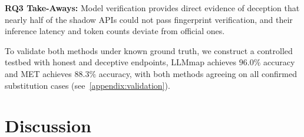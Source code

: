 \documentclass[letterpaper,twocolumn,10pt]{article}
\begin{document}
\begin{tcolorbox}[colback=gray!25!white, size=title,breakable,boxsep=1mm,colframe=white,before={\vskip1mm}, after={\vskip0mm}]
\textbf{RQ3 Take-Aways:}
        Model verification provides direct evidence of deception that nearly half of the shadow APIs could not pass fingerprint verification, and their inference latency and token counts deviate from official ones.
\end{tcolorbox}

To validate both methods under known ground truth, we construct a controlled testbed with honest and deceptive endpoints, LLMmap achieves $96.0\%$ accuracy and MET achieves $88.3\%$ accuracy, with both methods agreeing on all confirmed substitution cases (see~\autoref{appendix:validation}).

\section{Discussion}
\label{sec:discussion}

\end{document}
